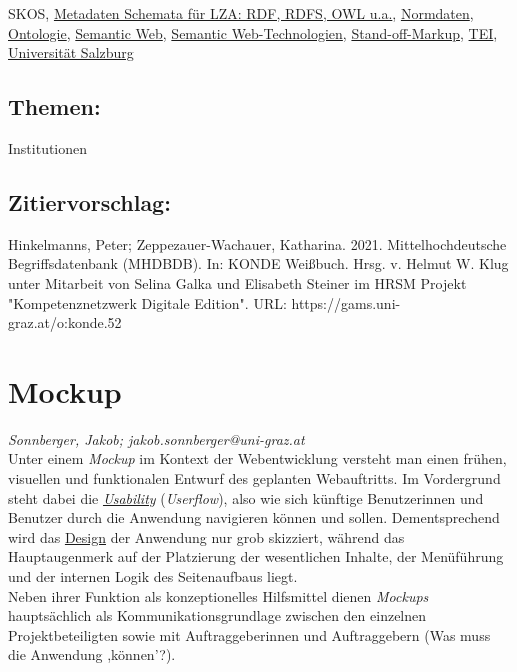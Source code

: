 \documentclass{article}
\begin{document}
{                           SKOS}, \href{https://gams.uni-graz.at/o:konde.131}{Metadaten Schemata für LZA: RDF,
                           RDFS, OWL u.a.}, \href{https://gams.uni-graz.at/o:konde.147}{Normdaten}, \href{https://gams.uni-graz.at/o:konde.151}{Ontologie}, \href{https://gams.uni-graz.at/o:konde.167}{Semantic Web}, \href{https://gams.uni-graz.at/o:konde.168}{Semantic Web-Technologien}, \href{https://gams.uni-graz.at/o:konde.171}{Stand-off-Markup}, \href{https://gams.uni-graz.at/o:konde.178}{TEI}, \href{https://gams.uni-graz.at/o:konde.203}{Universität Salzburg}\subsection*{Themen:}Institutionen\subsection*{Zitiervorschlag:}Hinkelmanns, Peter; Zeppezauer-Wachauer, Katharina. 2021. Mittelhochdeutsche Begriffsdatenbank (MHDBDB). In: KONDE Weißbuch. Hrsg. v. Helmut W. Klug unter Mitarbeit von Selina Galka und Elisabeth Steiner im HRSM Projekt "Kompetenznetzwerk Digitale Edition". URL: https://gams.uni-graz.at/o:konde.52\newpage\section*{Mockup} \emph{Sonnberger, Jakob; jakob.sonnberger@uni-graz.at }\\
        
    Unter einem \emph{Mockup} im Kontext der Webentwicklung versteht
                  man einen frühen, visuellen und funktionalen Entwurf des geplanten Webauftritts.
                  Im Vordergrund steht dabei die \emph{\href{http://gams.uni-graz.at/o:konde.205}{Usability}} (\emph{Userflow}), also wie sich künftige Benutzerinnen und
                  Benutzer durch die Anwendung navigieren können und sollen. Dementsprechend wird das \href{http://gams.uni-graz.at/o:konde.56}{Design} der Anwendung nur grob
                  skizziert, während das Hauptaugenmerk auf der Platzierung der wesentlichen
                  Inhalte, der Menüführung und der internen Logik des Seitenaufbaus liegt. \\
            
        Neben ihrer Funktion als konzeptionelles Hilfsmittel dienen \emph{Mockups} hauptsächlich als Kommunikationsgrundlage zwischen den einzelnen
                  Projektbeteiligten sowie mit Auftraggeberinnen und Auftraggebern (Was muss die
                  Anwendung ,können’?). \\
            
\end{document}
